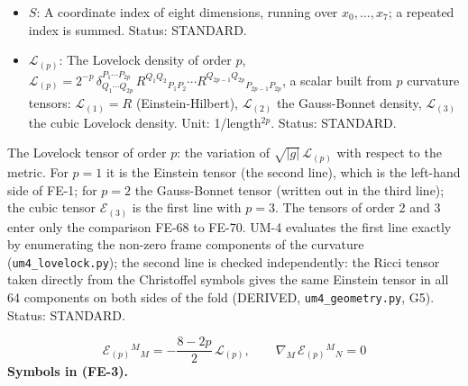 \documentclass[
  10pt,
]{article}
\begin{document}
\begin{itemize}
  the convention in which the commutator of two covariant derivatives,
  acting on a vector, is the Riemann tensor, with its last two indices
  those of the two derivatives, contracted with the vector), with two
  indices the Ricci tensor \(R_{MN} = R^P{}_{MPN}\), without indices the
  scalar curvature \(R = g^{MN}R_{MN}\); with frame indices
  \(R^{(a)(b)}{}_{(c)(d)}\) its frame components,
  \(R^{(a)(b)}{}_{(a)(b)}\) (no sum) the sectional curvature of the
  frame plane \((a, b)\). Unit: 1/length\(^2\). Status: STANDARD.
\item
  \(S\): A coordinate index of eight dimensions, running over
  \(x_0, \dots, x_7\); a repeated index is summed. Status: STANDARD.
\item
  \(\mathcal{L}_{(p)}\): The Lovelock density of order \(p\),
  \(\mathcal{L}_{(p)} = 2^{-p}\,\delta^{P_1\cdots P_{2p}}_{Q_1\cdots Q_{2p}}\,R^{Q_1Q_2}{}_{P_1P_2}\cdots R^{Q_{2p-1}Q_{2p}}{}_{P_{2p-1}P_{2p}}\),
  a scalar built from \(p\) curvature tensors: \(\mathcal{L}_{(1)} = R\)
  (Einstein-Hilbert), \(\mathcal{L}_{(2)}\) the Gauss-Bonnet density,
  \(\mathcal{L}_{(3)}\) the cubic Lovelock density. Unit:
  1/length\(^{2p}\). Status: STANDARD.
\end{itemize}

The Lovelock tensor of order \(p\): the variation of
\(\sqrt{\lvert g\rvert}\,\mathcal{L}_{(p)}\) with respect to the metric.
For \(p = 1\) it is the Einstein tensor (the second line), which is the
left-hand side of FE-1; for \(p = 2\) the Gauss-Bonnet tensor (written
out in the third line); the cubic tensor \(\mathcal{E}_{(3)}\) is the
first line with \(p = 3\). The tensors of order 2 and 3 enter only the
comparison FE-68 to FE-70. UM-4 evaluates the first line exactly by
enumerating the non-zero frame components of the curvature
(\texttt{um4\_lovelock.py}); the second line is checked independently:
the Ricci tensor taken directly from the Christoffel symbols gives the
same Einstein tensor in all 64 components on both sides of the fold
(DERIVED, \texttt{um4\_geometry.py}, G5). Status: STANDARD.

\[
\mathcal{E}_{(p)}{}^M{}_M = -\frac{8 - 2p}{2}\,\mathcal{L}_{(p)},\qquad \nabla_M\,\mathcal{E}_{(p)}{}^M{}_N = 0 \tag{FE-3}
\] \textbf{Symbols in (FE-3).}
\end{document}
